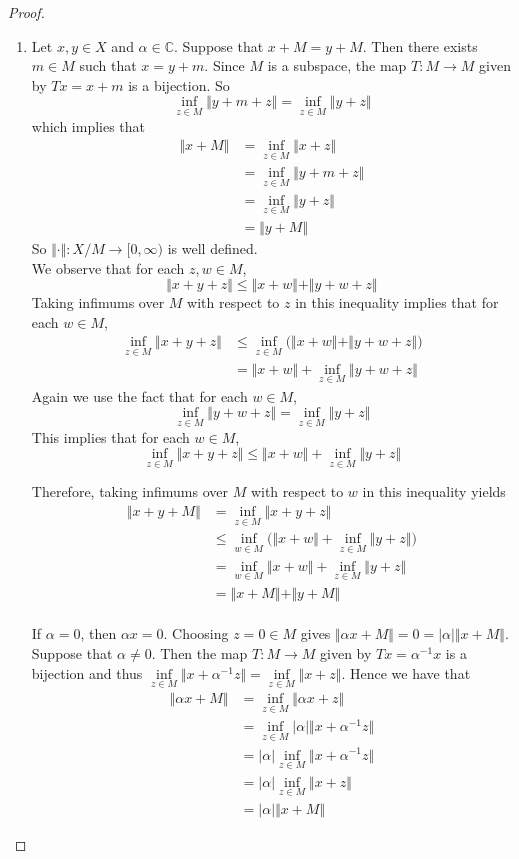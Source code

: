 \documentclass[12pt]{amsart}
\newcommand{\al}{\alpha}
\newcommand{\C}{\mathbb{C}}
\newcommand{\Rg}{[0,\infty)}
\newcommand{\n}{\Vert}
\begin{document}
\begin{proof}
\begin{enumerate}
\item  Let $x, y \in X$ and $\al \in \C$. Suppose that $x+M =y+M$. Then there exists $m \in M$ such that $x=y+m$. Since $M$ is a subspace, the map $T:M \rightarrow M$ given by $Tx = x+m$ is a bijection. So $$\inf_{z \in M} \n y+m+z \n = \inf_{z \in M} \n y+z \n$$ which implies that 
\begin{align*}
\n x +M \n 
&= \inf_{z \in M} \n x+z \n \\
&= \inf_{z \in M} \n y+m+z \n \\
&= \inf_{z \in M} \n y+z \n \\
&= \n y+M \n
\end{align*} 
So $\n \cdot \n: X/M \rightarrow \Rg$ is well defined.\vspace{.5cm}\\
We observe that for each $z,w \in M$, $$\n x+y+z \n \leq \n x+w \n + \n y+w+z \n$$
Taking infimums over $M$ with respect to $z$ in this inequality implies that for each $w \in M$,
\begin{align*}
\inf_{z \in M}\n x+y+z \n 
&\leq \inf_{z \in M} \bigg( \n x+w \n + \n y+w+z \n \bigg) \\
&= \n x+w \n +\inf_{z \in M}\n y+w+z \n
\end{align*}
Again we use the fact that for each $w \in M$, $$\inf_{z \in M}\n y+w+z \n = \inf_{z \in M}\n y+z \n$$
This implies that for each $w \in M$, $$\inf_{z \in M}\n x+y+z \n \leq \n x+w \n + \inf_{z \in M}\n y+z \n$$

Therefore, taking infimums over $M$ with respect to $w$ in this inequality yields
\begin{align*}
\n x+y+M \n
&= \inf_{z \in M} \n x+y +z \n\\
& \leq \inf_{w \in M} \bigg(\n x+w \n + \inf_{z \in M}\n y+z \n \bigg)\\
&= \inf_{w \in M} \n x+w \n + \inf_{z \in M}\n y+z \n\\
&= \n x+M \n + \n y+M \n
\end{align*}
\vspace{.5cm}\\
If $\al =0$, then $\al x = 0$. Choosing $z = 0 \in M$ gives $\n \al x+M \n =0 = \vert \al \vert \n x+M \n $. Suppose that $\al \neq 0$. Then the map $T:M \rightarrow M$ given by $Tx = \al ^{-1}x$ is a bijection and thus $\inf\limits_{z \in M} \n x+\al^{-1}z \n = \inf\limits_{z \in M} \n x+z \n$. Hence we have that
\begin{align*}
\n \al x+M \n
&= \inf_{z \in M} \n \al x +z \n \\
&= \inf_{z \in M} \vert \al \vert \n x +\al^{-1}z \n \\
&= \vert \al \vert \inf_{z \in M}\n x +\al^{-1}z \n\\
&= \vert \al \vert \inf_{z \in M}\n x +z \n \\
&= \vert \al \vert \n x+M \n
\end{align*} 


\end{enumerate}
\end{proof}
\end{document}
